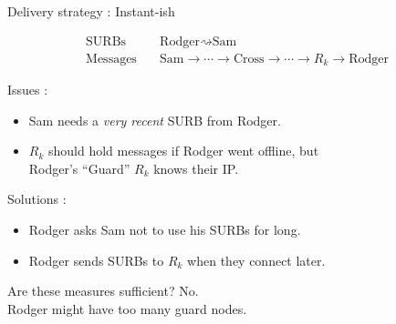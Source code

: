 \documentclass[fleqn,xcolor={usenames,dvipsnames}]{beamer}
\begin{document}
\begin{frame}[t]{Delivery strategy : Instant-ish }

\[ \begin{aligned}
\textrm{SURBs}\quad & \textrm{Rodger} \rightsquigarrow \textrm{Sam} \\
\textrm{Messages}\quad & \textrm{Sam} \to \cdots \to \textrm{Cross} \to \cdots \to R_k \to \textrm{Rodger}
\end{aligned} \]

Issues :
\begin{itemize}
\item Sam needs a {\em very recent} SURB from Rodger.  
\item $R_k$ should hold messages if Rodger went offline, but \\ 
 \hspace*{2pt} Rodger's ``Guard'' $R_k$ knows their IP. \\
\end{itemize}


Solutions : 
\begin{itemize}
\item Rodger asks Sam not to use his SURBs for long. \\
\item Rodger sends SURBs to $R_k$ when they connect later.
\end{itemize}

\bigskip
Are these measures sufficient?  No. \\
 \hspace*{2pt} Rodger might have too many guard nodes.

\end{frame}
\end{document}
